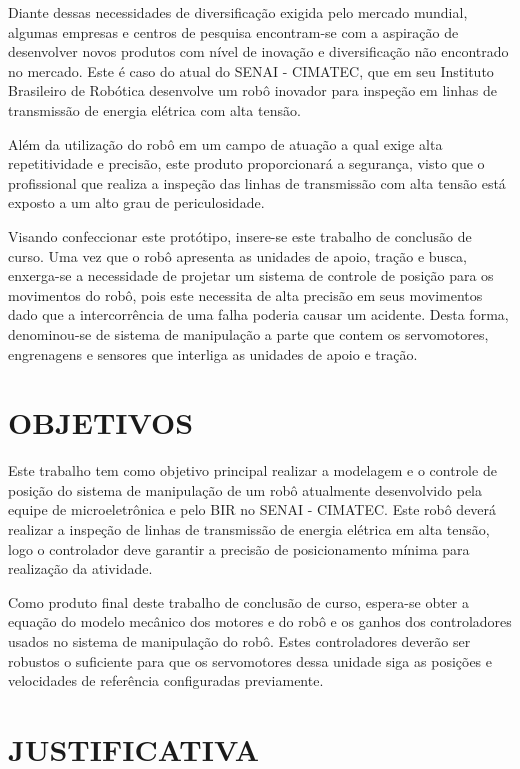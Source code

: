 \documentclass[12pt,oneside,a4paper, chapter=TITLE, section = TITLE, english, brazil]{abntex2}
\begin{document}
Diante dessas necessidades de diversificação exigida pelo mercado mundial, algumas empresas e centros de pesquisa encontram-se com a aspiração de desenvolver novos produtos com nível de inovação e diversificação não encontrado no mercado. Este é caso do atual do SENAI - CIMATEC, que em seu Instituto Brasileiro de Robótica desenvolve um robô inovador para inspeção em linhas de transmissão de energia elétrica com alta tensão.

Além da utilização do robô em um campo de atuação a qual exige alta repetitividade e precisão, este produto proporcionará a segurança, visto que o profissional que realiza a inspeção das linhas de transmissão com alta tensão está exposto a um alto grau de periculosidade.

Visando confeccionar este protótipo, insere-se este trabalho de conclusão de curso. Uma vez que o robô apresenta as unidades de apoio, tração e busca, enxerga-se a necessidade de projetar um sistema de controle de posição para os movimentos do robô, pois este necessita de alta precisão em seus movimentos dado que a intercorrência de uma falha poderia causar um acidente. Desta forma, denominou-se de sistema de manipulação a parte que contem os servomotores, engrenagens e sensores que interliga as unidades de apoio e tração.

\section{OBJETIVOS} %

Este trabalho tem como objetivo principal realizar a modelagem e o controle de posição do sistema de manipulação de um robô atualmente desenvolvido pela equipe de microeletrônica e pelo BIR no SENAI - CIMATEC. Este robô deverá realizar a inspeção de linhas de transmissão de energia elétrica em alta tensão, logo o controlador deve garantir a precisão de posicionamento mínima para realização da atividade.

Como produto final deste trabalho de conclusão de curso, espera-se obter a equação do modelo mecânico dos motores e do robô e os ganhos dos controladores usados no sistema de manipulação do robô. Estes controladores deverão ser robustos o suficiente para que os servomotores dessa unidade siga as posições e velocidades de referência configuradas previamente.

\section{JUSTIFICATIVA} %
\end{document}
